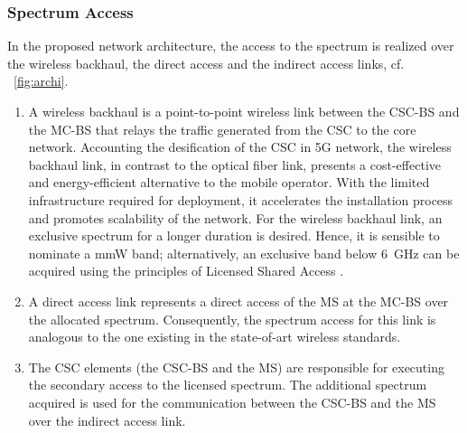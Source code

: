 \subsubsection*{Spectrum Access}
In the proposed network architecture, the access to the spectrum is realized over the wireless backhaul, the direct access and the indirect access links, cf. \figurename~\ref{fig:archi}.
\begin{enumerate}
\item A wireless backhaul is a
point-to-point wireless link between the CSC-BS and the MC-BS that relays the traffic generated from the CSC to the core network. Accounting the desification of the CSC in 5G network, the wireless backhaul link, in contrast to the optical fiber link, presents a cost-effective and energy-efficient alternative to the mobile operator.
With the limited infrastructure required for deployment, it accelerates the installation process and promotes scalability of the network.
For the wireless backhaul link, an exclusive spectrum for a longer duration is desired. Hence, it is sensible to nominate a mmW band; alternatively, an exclusive band below \SI{6}{GHz} can be acquired using the principles of Licensed Shared Access \cite{ETSI13}.

\item A direct access link represents a direct access of the MS at the MC-BS over the allocated spectrum. Consequently, the spectrum access for this link is analogous to the one existing in the state-of-art wireless standards.
\item The CSC elements (the CSC-BS and the MS) are responsible for executing the secondary access to the licensed spectrum. The additional spectrum acquired is used for the communication between the CSC-BS and the MS over the indirect access link.
\end{enumerate}


